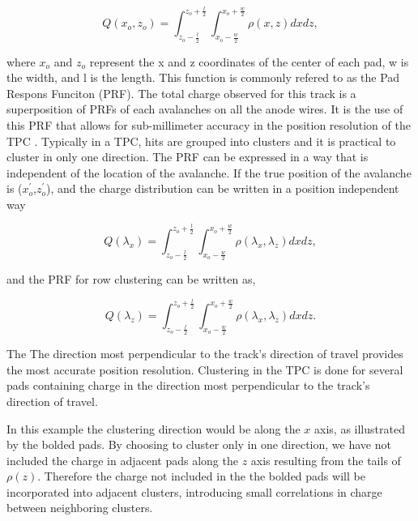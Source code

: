 \begin{equation}
Q(x_o,z_o) = \int_{z_o - \frac{l}{2}}^{z_o + \frac{l}{2}} \int_{x_o - \frac{w}{2}}^{x_o + \frac{w}{2}} \rho(x,z) dxdz,
\label{eq:prfpadCharge}
\end{equation}

where $x_o$ and $z_o$ represent the x and z coordinates of the center of each pad, w is the width, and l is the length. This function is commonly refered to as the Pad Respons Funciton (PRF). The total charge observed for this track is a superposition of PRFs of each avalanches on all the anode wires. It is the use of this PRF that allows for sub-millimeter accuracy in the position resolution of the TPC \cite{blumrol}. Typically in a TPC, hits are grouped into clusters and it is practical to cluster in only one direction. The PRF can be expressed in a way that is independent of the location of the avalanche. If the true position of the avalanche is ($x_o^{'}$,$z_o^{'}$), and the charge distribution can be written in a position independent way %

\begin{equation}
Q(\lambda_x) = \int_{z_o - \frac{l}{2}}^{z_o + \frac{l}{2}} \int_{x_o - \frac{w}{2}}^{x_o + \frac{w}{2}} \rho(\lambda_x,\lambda_z) dxdz,
\label{eq:prflayer}
\end{equation}

and the PRF for row clustering can be written as, 

\begin{equation}
Q(\lambda_z) = \int_{z_o - \frac{l}{2}}^{z_o + \frac{l}{2}} \int_{x_o - \frac{w}{2}}^{x_o + \frac{w}{2}} \rho(\lambda_x,\lambda_z) dxdz.
\label{eq:prfrow}
\end{equation}

The The direction most perpendicular to the track's direction of travel provides the most accurate position resolution.  Clustering in the \spirit TPC is done for several pads containing charge in the direction most perpendicular to the track's direction of travel. 

In this example the clustering direction would be along the $x$ axis, as illustrated by the bolded pads. By choosing to cluster only in one direction, we have not included the charge in adjacent pads along the $z$ axis resulting from the tails of $\rho(z)$. Therefore the charge not included in the the bolded pads will be incorporated into adjacent clusters, introducing small correlations in charge between neighboring clusters. 

